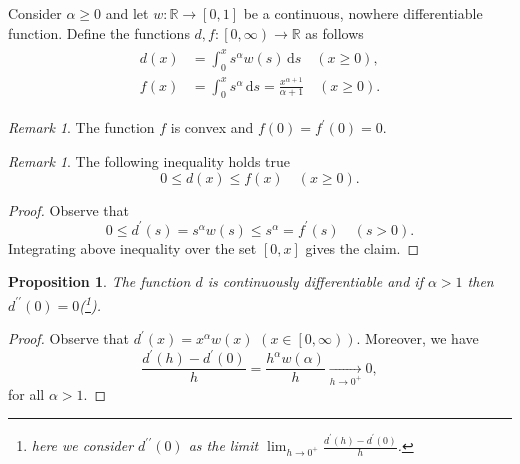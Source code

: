 \documentclass[12pt]{article}
\newcommand{\R}{\mathbb{R}}
\newcommand{\dd}{\,\mathrm{d}}
\newcommand{\dprime}{{\prime\prime}}
\renewcommand{\leq}{\leqslant}
\renewcommand{\geq}{\geqslant}
\newcommand{\convto}[2]{\xrightarrow[#2]{#1}}
\newcommand{\paren}[1]{\! \left( #1 \right) }
\newcommand{\bracket}[1]{\! \left[ #1 \right] }  %
\theoremstyle{plain}
\newtheorem{proposition}[theorem]{Proposition}
\theoremstyle{definition}
\theoremstyle{remark}
\newtheorem{remark}[theorem]{Remark}
\begin{document}
Consider $\alpha \geq 0$ and let $w \colon \R \to \bracket{0, 1}$ be a continuous, nowhere differentiable function.
Define the functions $d, f \colon \left[0, \infty\right) \to \R$ as follows
\begin{align} \label{eq::definition_of_d_and_f}
    \begin{split}
        d\paren{x} & = \int_0^x s^\alpha w\paren{s} \dd s \quad \paren{x \geq 0}, \\
        f\paren{x} & = \int_0^x s^\alpha \dd s = \frac{x^{\alpha+1}}{\alpha+1} \quad \paren{x \geq 0}.
    \end{split}
\end{align}
 
\begin{remark} \label{remark::properties_of_f}
    The function $f$ is convex and $f\paren{0} = f^\prime\paren{0} = 0$.
\end{remark}

\begin{remark} \label{remark::estimate}
    The following inequality holds true 
    \begin{equation*}
        0 \leq d\paren{x} \leq f\paren{x} \quad \paren{x \geq 0}.
     \end{equation*}
\end{remark}
\begin{proof}
    Observe that
    \begin{equation*}
        0 \leq d^\prime\paren{s} = s^\alpha w\paren{s} \leq s^\alpha = f^\prime\paren{s} \quad \paren{s > 0}.
    \end{equation*}
    Integrating above inequality over the set $\bracket{0, x}$ gives the claim.
\end{proof}
 
\begin{proposition} \label{prop::d_is_C1}
    The function $d$ is continuously differentiable and if $\alpha>1$ then $d^\dprime\paren{0} = 0$(\footnote{here we consider $d^\dprime\paren{0}$ as the limit $\lim_{h \to 0^+} \frac{d^\prime\paren{h} - d^\prime\paren{0}}{h}$.}).
\end{proposition}
\begin{proof}
    Observe that $d^\prime\paren{x} = x^\alpha w\paren{x}$ $\paren{x \in \left[0, \infty\right)}$.
    Moreover, we have
    \begin{equation*}
        \frac{d^\prime\paren{h} - d^\prime\paren{0}}{h} = \frac{h^\alpha w\paren{\alpha}}{h} \convto{}{h \to 0^+} 0,
    \end{equation*}
    for all $\alpha > 1$.
\end{proof}
\end{document}
